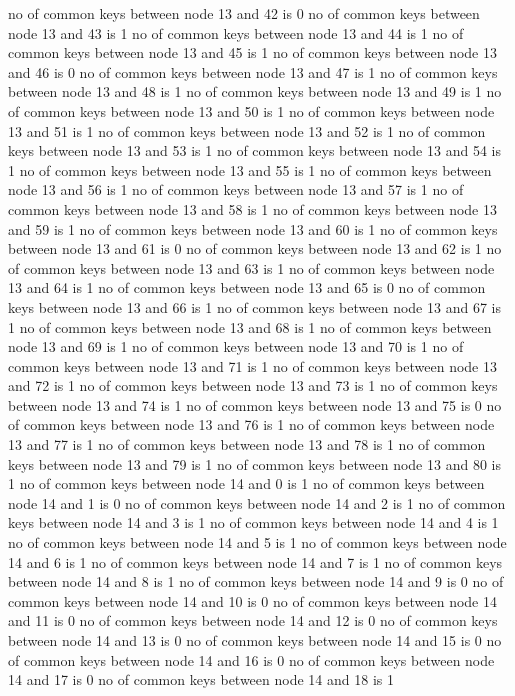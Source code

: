 no of common keys between node 13 and 42 is 0
no of common keys between node 13 and 43 is 1
no of common keys between node 13 and 44 is 1
no of common keys between node 13 and 45 is 1
no of common keys between node 13 and 46 is 0
no of common keys between node 13 and 47 is 1
no of common keys between node 13 and 48 is 1
no of common keys between node 13 and 49 is 1
no of common keys between node 13 and 50 is 1
no of common keys between node 13 and 51 is 1
no of common keys between node 13 and 52 is 1
no of common keys between node 13 and 53 is 1
no of common keys between node 13 and 54 is 1
no of common keys between node 13 and 55 is 1
no of common keys between node 13 and 56 is 1
no of common keys between node 13 and 57 is 1
no of common keys between node 13 and 58 is 1
no of common keys between node 13 and 59 is 1
no of common keys between node 13 and 60 is 1
no of common keys between node 13 and 61 is 0
no of common keys between node 13 and 62 is 1
no of common keys between node 13 and 63 is 1
no of common keys between node 13 and 64 is 1
no of common keys between node 13 and 65 is 0
no of common keys between node 13 and 66 is 1
no of common keys between node 13 and 67 is 1
no of common keys between node 13 and 68 is 1
no of common keys between node 13 and 69 is 1
no of common keys between node 13 and 70 is 1
no of common keys between node 13 and 71 is 1
no of common keys between node 13 and 72 is 1
no of common keys between node 13 and 73 is 1
no of common keys between node 13 and 74 is 1
no of common keys between node 13 and 75 is 0
no of common keys between node 13 and 76 is 1
no of common keys between node 13 and 77 is 1
no of common keys between node 13 and 78 is 1
no of common keys between node 13 and 79 is 1
no of common keys between node 13 and 80 is 1
no of common keys between node 14 and 0 is 1
no of common keys between node 14 and 1 is 0
no of common keys between node 14 and 2 is 1
no of common keys between node 14 and 3 is 1
no of common keys between node 14 and 4 is 1
no of common keys between node 14 and 5 is 1
no of common keys between node 14 and 6 is 1
no of common keys between node 14 and 7 is 1
no of common keys between node 14 and 8 is 1
no of common keys between node 14 and 9 is 0
no of common keys between node 14 and 10 is 0
no of common keys between node 14 and 11 is 0
no of common keys between node 14 and 12 is 0
no of common keys between node 14 and 13 is 0
no of common keys between node 14 and 15 is 0
no of common keys between node 14 and 16 is 0
no of common keys between node 14 and 17 is 0
no of common keys between node 14 and 18 is 1
